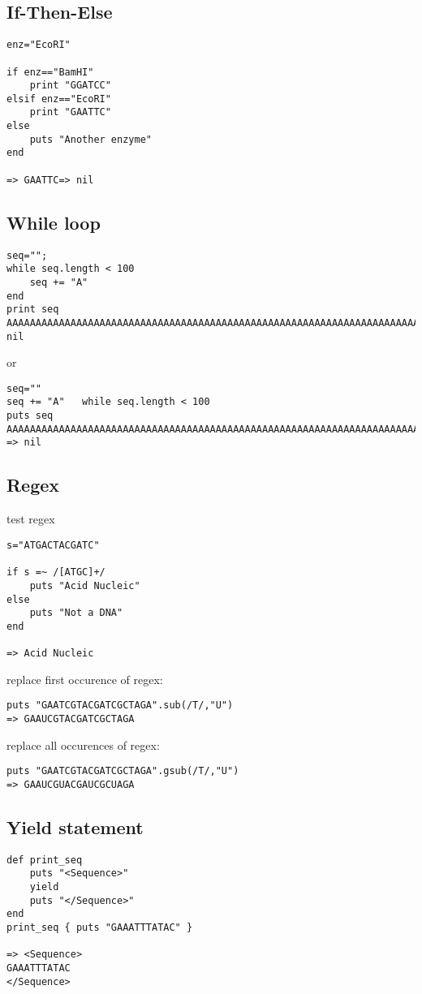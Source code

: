 \documentclass{article}
\begin{document}
\subsection{If-Then-Else}
\begin{lstlisting}
enz="EcoRI"

if enz=="BamHI"
	print "GGATCC"
elsif enz=="EcoRI"
	print "GAATTC"
else
	puts "Another enzyme"
end

=> GAATTC=> nil
\end{lstlisting}

\subsection{While loop}
\begin{lstlisting}
seq="";
while seq.length < 100
	seq += "A"
end
print seq
AAAAAAAAAAAAAAAAAAAAAAAAAAAAAAAAAAAAAAAAAAAAAAAAAAAAAAAAAAAAAAAAAAAAAAAAAAAAAAAAAAAAAAAAAAAAAAAAAAAA=> nil
\end{lstlisting}
or
\begin{lstlisting}
seq=""
seq += "A"   while seq.length < 100
puts seq
AAAAAAAAAAAAAAAAAAAAAAAAAAAAAAAAAAAAAAAAAAAAAAAAAAAAAAAAAAAAAAAAAAAAAAAAAAAAAAAAAAAAAAAAAAAAAAAAAAAA
=> nil
\end{lstlisting}

\subsection{Regex}
test regex
\begin{lstlisting}
s="ATGACTACGATC"

if s =~ /[ATGC]+/
	puts "Acid Nucleic"
else
	puts "Not a DNA"
end

=> Acid Nucleic
\end{lstlisting}

replace first occurence of regex:
\begin{lstlisting}
puts "GAATCGTACGATCGCTAGA".sub(/T/,"U")
=> GAAUCGTACGATCGCTAGA
\end{lstlisting}
replace all occurences of regex:
\begin{lstlisting}
puts "GAATCGTACGATCGCTAGA".gsub(/T/,"U")
=> GAAUCGUACGAUCGCUAGA
\end{lstlisting}
\subsection{Yield statement}

\begin{lstlisting}
def print_seq
	puts "<Sequence>"
	yield
	puts "</Sequence>"
end
print_seq { puts "GAAATTTATAC" }

=> <Sequence>
GAAATTTATAC
</Sequence>
\end{lstlisting}
\end{document}
